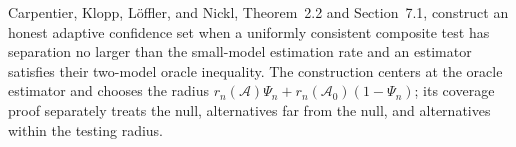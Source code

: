 Carpentier, Klopp, L\"offler, and Nickl, Theorem~2.2 and Section~7.1, construct an honest adaptive confidence set when a uniformly consistent composite test has separation no larger than the small-model estimation rate and an estimator satisfies their two-model oracle inequality.  The construction centers at the oracle estimator and chooses the radius \(r_n(\mathcal A)\Psi_n+r_n(\mathcal A_0)(1-\Psi_n)\); its coverage proof separately treats the null, alternatives far from the null, and alternatives within the testing radius.